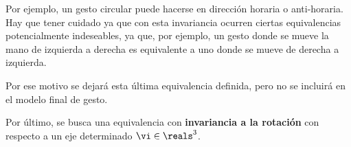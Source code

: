  
Por ejemplo, un gesto circular puede hacerse en dirección horaria o anti-horaria. Hay que tener cuidado ya que con esta invariancia ocurren ciertas equivalencias potencialmente indeseables, ya que, por ejemplo, un gesto donde se mueve la mano de izquierda a derecha es equivalente a uno donde se mueve de derecha a izquierda.

Por ese motivo se dejará esta última equivalencia definida, pero no se incluirá en el modelo final de gesto.


Por último, se busca una equivalencia con \textbf{invariancia a la rotación} con respecto a un eje determinado $\vi \in \reals^3$. 




%
%
%
%

